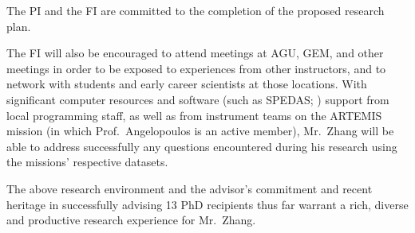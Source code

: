 \documentclass[
  letterpaper,
  DIV=11,
  numbers=noendperiod]{scrartcl}
\begin{document}
The PI and the FI are committed to the completion of the proposed
research plan.

The FI will also be encouraged to attend meetings at AGU, GEM, and other
meetings in order to be exposed to experiences from other instructors,
and to network with students and early career scientists at those
locations. With significant computer resources and software (such as
SPEDAS; \citep{Angelopoulos19}) support from local programming staff, as
well as from instrument teams on the ARTEMIS mission (in which
Prof.~Angelopoulos is an active member), Mr.~Zhang will be able to
address successfully any questions encountered during his research using
the missions' respective datasets.

The above research environment and the advisor's commitment and recent
heritage in successfully advising 13 PhD recipients thus far warrant a
rich, diverse and productive research experience for Mr.~Zhang.


\renewcommand\refname{Budget Narrative (Budget Justification)}
\end{document}
